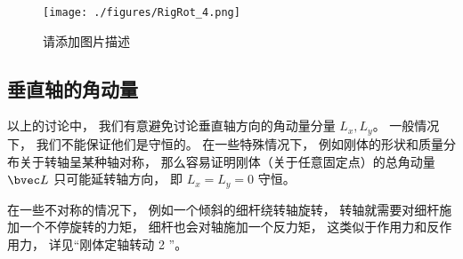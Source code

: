 \begin{example}{}\label{RigRot_ex2}
\begin{figure}[ht]
\centering
\texttt{[image: ./figures/RigRot\_4.png]}
\caption{请添加图片描述} \label{RigRot_fig4}
\end{figure}
\end{example}

\subsection{垂直轴的角动量}
以上的讨论中， 我们有意避免讨论垂直轴方向的角动量分量 $L_x, L_y$。 一般情况下， 我们不能保证他们是守恒的。 在一些特殊情况下， 例如刚体的形状和质量分布关于转轴呈某种轴对称， 那么容易证明刚体（关于任意固定点）的总角动量 $\bvec L$ 只可能延转轴方向， 即 $L_x = L_y = 0$ 守恒。 %

在一些不对称的情况下， 例如一个倾斜的细杆绕转轴旋转， %
转轴就需要对细杆施加一个不停旋转的力矩， 细杆也会对轴施加一个反力矩， 这类似于作用力和反作用力， 详见“刚体定轴转动 2 ”。

